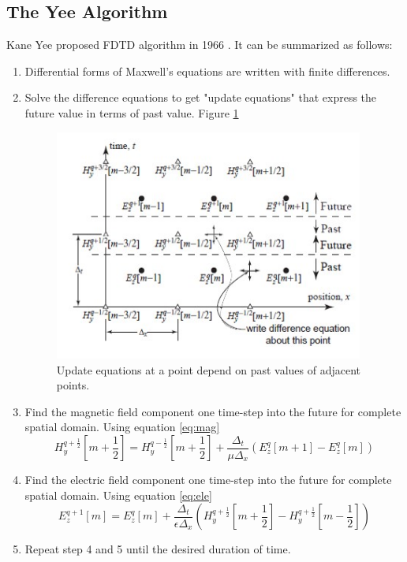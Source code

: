 \subsection{The Yee Algorithm}
Kane Yee proposed FDTD algorithm in 1966\cite{kane}
. It can be summarized as follows:
\begin{enumerate}
\item Differential forms of Maxwell's equations are written with finite differences.
\item Solve the difference equations to get "update equations" that express the future value in terms of past value. Figure \ref{fig:fdtd}
\begin{figure}[htbp]
	\centering
		\includegraphics[width=4in]{Pictures/fdtd.jpg}
	\caption[FDTD update equations]{Update equations at a point depend on past values of adjacent points.}
	\label{fig:fdtd}
\end{figure} 
\item Find the magnetic field component one time-step into the future for complete spatial domain. Using equation \eqref{eq:mag}
\begin{equation}
	H_y^{q+\frac {1}{2}} \left[ m + \frac {1}{2} \right] = H_y^{q-\frac {1}{2}} \left[ m + \frac {1}{2} \right]
+ \frac {\Delta_t}{\mu\Delta_x} \left( E_z^q \left[ m+1 \right] - E_z^q \left[m\right] \right)
\label{eq:mag}
\end{equation}
\item Find the electric field component one time-step into the future for complete spatial domain. Using equation \eqref{eq:ele}
\begin{equation}
 E_z^{q+1} \left[m\right] =  E_z^q \left[m\right] + \frac {\Delta_t}{\epsilon\Delta_x}  \left( H_y^{q+\frac {1}{2}} \left[ m + \frac {1}{2} \right] - H_y^{q+\frac {1}{2}} \left[ m - \frac {1}{2} \right]  \right)
\label{eq:ele}
\end{equation}
\item Repeat step 4 and 5 until the desired duration of time.
\end{enumerate}

